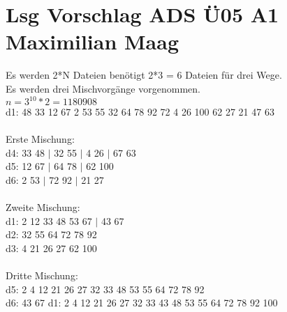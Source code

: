 \documentclass{article}
\begin{document}
	\section*{Lsg Vorschlag ADS Ü05 A1 Maximilian Maag}
	Es werden 2*N Dateien benötigt 2*3 = 6 Dateien für drei Wege. \\
	Es werden drei Mischvorgänge vorgenommen. \\
	$ n = 3^{10}*2 = 1180908$ \\
	d1: 48 33 12 67 2 53 55 32 64 78 92 72 4 26 100 62 27 21 47 63 \\ \\
	Erste Mischung: \\
	d4: 33 48 $|$ 32 55 $|$ 4 26 $|$ 67 63\\
	d5: 12 67 $|$ 64 78 $|$ 62 100\\
	d6: 2 53  $|$ 72 92 $|$ 21 27 \\ \\
	Zweite Mischung: \\
	d1: 2 12 33 48 53 67 $|$ 43 67 \\
	d2: 32 55 64 72 78 92 \\
	d3: 4 21 26 27 62 100 \\ \\
	Dritte Mischung: \\
	d5: 2 4 12 21 26 27 32 33 48 53 55 64 72 78 92 \\
	d6: 43 67 
	d1: 2 4 12 21 26 27 32 33 43 48 53 55 64 72 78 92 100 \\
\end{document}
